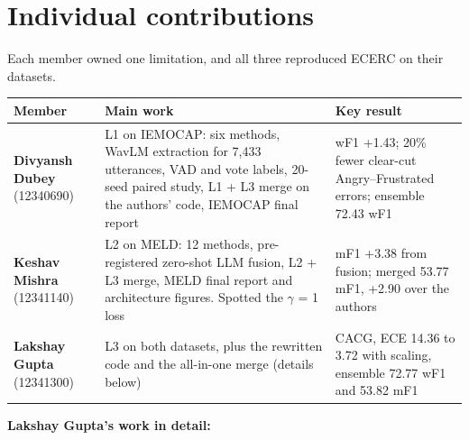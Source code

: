 \documentclass[11pt,a4paper]{article}
\begin{document}
\appendix

\section{Individual contributions}
\label{app:contrib}

Each member owned one limitation, and all three reproduced ECERC on their datasets.

{\small
\begin{longtable}{L{3.2cm}L{8.1cm}L{4.8cm}}
\toprule
Member & Main work & Key result \\
\midrule
\endhead
\bottomrule
\endlastfoot
\textbf{Divyansh Dubey} (12340690) & L1 on IEMOCAP: six methods, WavLM extraction for 7,433 utterances, VAD and vote labels, 20-seed paired study, L1 + L3 merge on the authors' code, IEMOCAP final report & wF1 +1.43; 20\% fewer clear-cut Angry--Frustrated errors; ensemble 72.43 wF1 \\
\textbf{Keshav Mishra} (12341140) & L2 on MELD: 12 methods, pre-registered zero-shot LLM fusion, L2 + L3 merge, MELD final report and architecture figures. Spotted the $\gamma$ = 1 loss & mF1 +3.38 from fusion; merged 53.77 mF1, +2.90 over the authors \\
\textbf{Lakshay Gupta} (12341300) & L3 on both datasets, plus the rewritten code and the all-in-one merge (details below) & CACG, ECE 14.36 to 3.72 with scaling, ensemble 72.77 wF1 and 53.82 mF1 \\
\end{longtable}
}

\textbf{Lakshay Gupta's work in detail:}
\end{document}
